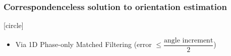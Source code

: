 \begin{frame}[noframenumbering]

  \frametitle{Correspondenceless solution to orientation estimation}


  \vspace{0.1cm}
  [circle]
  \begin{itemize}
    \item Via 1D Phase-only Matched Filtering {\footnotesize (error $\leq \dfrac{\text{angle increment}}{2}$)}
  \end{itemize}
  \vspace{-0.25cm}

  \begin{center}
  \end{center}

\end{frame}
